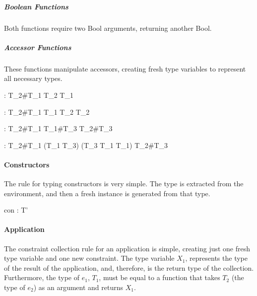\documentclass[class=article, crop=false]{standalone}
\begin{document}
\subparagraph{Boolean Functions}

Both functions require two Bool arguments, returning another Bool.



\subparagraph{Accessor Functions}

These functions manipulate accessors, creating fresh type variables to represent all necessary types.

    {\Gamma \vdash {} : T_2\#T_1 \rightarrow T_2 \rightarrow T_1}

    {\Gamma \vdash {} : T_2\#T_1 \rightarrow T_1 \rightarrow T_2 \rightarrow T_2}

    {\Gamma \vdash {} : T_2\#T_1 \rightarrow T_1\#T_3 \rightarrow T_2\#T_3}

    {\Gamma \vdash {} : T_2\#T_1 \rightarrow (T_1 \rightarrow T_3) \rightarrow (T_3 \rightarrow T_1 \rightarrow T_1) \rightarrow T_2\#T_3}

\paragraph{Constructors}

The rule for typing constructors is very simple.
The type is extracted from the environment, and then a fresh instance is generated from that type.

    {\Gamma \vdash con : T'}

\paragraph{Application}

The constraint collection rule for an application is simple, creating just one fresh type variable and one new constraint.
The type variable $X_1$, represents the type of the result of the application, and, therefore, is the return type of the collection.
Furthermore, the type of $e_1$, $T_1$, must be equal to a function that takes $T_2$ (the type of $e_2$) as an argument and returns $X_1$.
\end{document}
